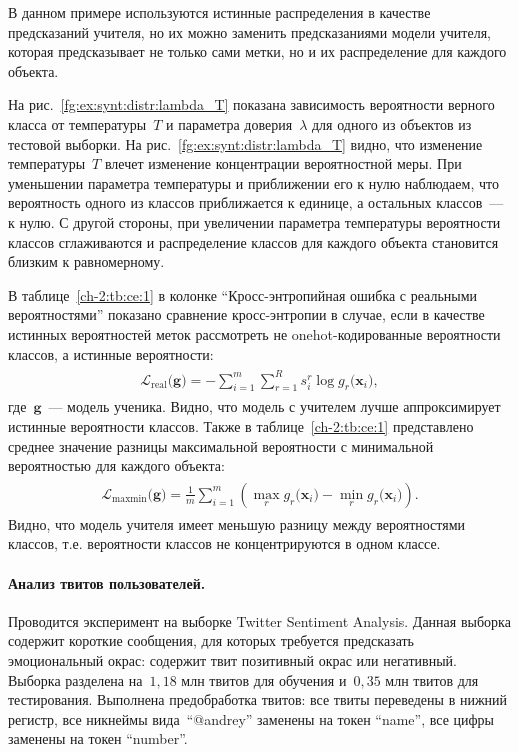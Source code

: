 В данном примере используются истинные распределения в качестве предсказаний учителя, но их можно заменить предсказаниями модели учителя, которая предсказывает не только сами метки, но и их распределение для каждого объекта.

На рис.~\ref{fg:ex:synt:distr:lambda_T} показана зависимость вероятности верного класса от температуры~$T$ и параметра доверия~$\lambda$ для одного из объектов из тестовой выборки. На рис.~\ref{fg:ex:synt:distr:lambda_T} видно, что изменение температуры~$T$ влечет изменение концентрации вероятностной меры. При уменьшении параметра температуры и приближении его к нулю наблюдаем, что вероятность одного из классов приближается к единице, а остальных классов~--- к нулю. С другой стороны, при увеличении параметра температуры вероятности классов сглаживаются и распределение классов для каждого объекта становится близким к равномерному.

В таблице~\ref{ch-2:tb:ce:1} в колонке ``Кросс-энтропийная ошибка с реальными вероятностями'' показано сравнение кросс-энтропии в случае, если в качестве истинных вероятностей меток рассмотреть не onehot-кодированные вероятности классов, а истинные вероятности:
\begin{gather}
\label{eq:ce:1}
\begin{aligned}
\mathcal{L}_{\text{real}}\bigr(\mathbf{g}\bigr) = - \sum_{i=1}^{m}\sum_{r=1}^{R}s_{i}^{r}\log g_r\bigr(\mathbf{x}_i\bigr),
\end{aligned}
\end{gather}
где~$\mathbf{g}$~--- модель ученика. Видно, что модель с учителем лучше аппроксимирует истинные вероятности классов. Также в таблице~\ref{ch-2:tb:ce:1}
представлено среднее значение разницы максимальной вероятности с минимальной вероятностью для каждого объекта:
\begin{gather}
\label{eq:ce:2}
\begin{aligned}
\mathcal{L}_{\text{maxmin}}\bigr(\mathbf{g}\bigr) = \frac{1}{m}\sum_{i=1}^{m}\left(\max_{r}g_r\bigr(\mathbf{x}_i\bigr) -  \min_{r}g_r\bigr(\mathbf{x}_i\bigr)\right).
\end{aligned}
\end{gather}
Видно, что модель учителя имеет меньшую разницу между вероятностями классов, т.е. вероятности классов не концентрируются в одном классе.


\paragraph{Анализ твитов пользователей.}Проводится эксперимент на выборке Twitter Sentiment Analysis. Данная выборка содержит короткие сообщения, для которых требуется предсказать эмоциональный окрас: содержит твит позитивный окрас или негативный. Выборка разделена на~$1{,}18$ млн твитов для обучения и~$0{,}35$ млн твитов для тестирования. Выполнена предобработка твитов: все твиты переведены в нижний регистр, все никнеймы вида~``@andrey'' заменены на токен ``name'', все цифры заменены на токен ``number''.

